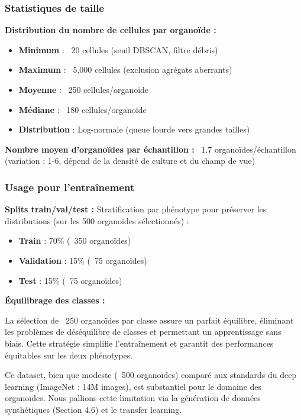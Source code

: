 \subsubsection{Statistiques de taille}

\textbf{Distribution du nombre de cellules par organoïde :}
\begin{itemize}
    \item \textbf{Minimum} : ~20 cellules (seuil DBSCAN, filtre débris)
    \item \textbf{Maximum} : ~5,000 cellules (exclusion agrégats aberrants)
    \item \textbf{Moyenne} : ~250 cellules/organoïde
    \item \textbf{Médiane} : ~180 cellules/organoïde
    \item \textbf{Distribution} : Log-normale (queue lourde vers grandes tailles)
\end{itemize}

\textbf{Nombre moyen d'organoïdes par échantillon :}
~1.7 organoïdes/échantillon (variation : 1-6, dépend de la densité de culture et du champ de vue)

\subsubsection{Usage pour l'entraînement}

\textbf{Splits train/val/test :}
Stratification par phénotype pour préserver les distributions (sur les 500 organoïdes sélectionnés) :
\begin{itemize}
    \item \textbf{Train} : 70\% (~350 organoïdes)
    \item \textbf{Validation} : 15\% (~75 organoïdes)
    \item \textbf{Test} : 15\% (~75 organoïdes)
\end{itemize}

\textbf{Équilibrage des classes :}

La sélection de ~250 organoïdes par classe assure un parfait équilibre, éliminant les problèmes de déséquilibre de classes et permettant un apprentissage sans biais. Cette stratégie simplifie l'entraînement et garantit des performances équitables sur les deux phénotypes.

Ce dataset, bien que modeste (~500 organoïdes) comparé aux standards du deep learning (ImageNet : 14M images), est substantiel pour le domaine des organoïdes. Nous pallions cette limitation via la génération de données synthétiques (Section 4.6) et le transfer learning.

